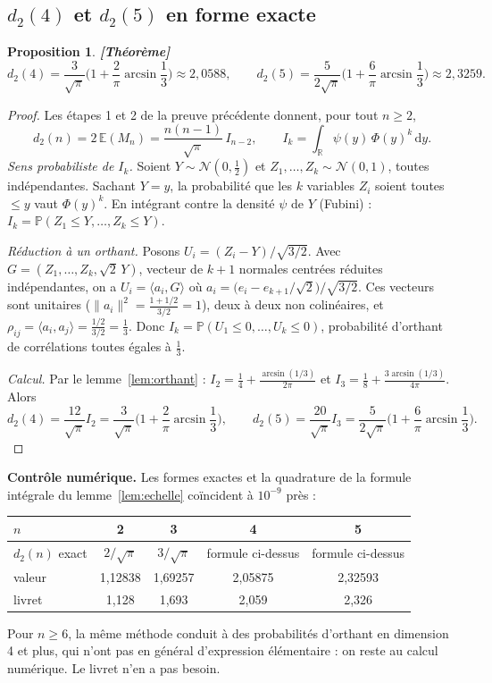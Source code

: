\documentclass[11pt,a4paper]{article}
\theoremstyle{tq}
\newtheorem{prop}{Proposition}
\theoremstyle{remark}
\newcommand{\thm}{\textcolor{vertTQ}{\textbf{[Théorème]}}}
\newcommand{\E}{\mathbb{E}}
\renewcommand{\P}{\mathbb{P}}
\newcommand{\R}{\mathbb{R}}
\newcommand{\N}{\mathcal{N}}
\newcommand{\dd}{\,\mathrm{d}}
\begin{document}
\subsection{$d_2(4)$ et $d_2(5)$ en forme exacte}
\begin{prop}\thm{}
\[
d_2(4)=\frac{3}{\sqrt\pi}\Big(1+\frac2\pi\arcsin\frac13\Big)\approx2{,}0588,\qquad
d_2(5)=\frac{5}{2\sqrt\pi}\Big(1+\frac6\pi\arcsin\frac13\Big)\approx2{,}3259 .
\]
\end{prop}
\begin{proof}
Les étapes 1 et 2 de la preuve précédente donnent, pour tout $n\ge2$,
\[
d_2(n)=2\,\E(M_n)=\frac{n(n-1)}{\sqrt\pi}\,I_{n-2},\qquad I_k=\int_{\R}\psi(y)\,\Phi(y)^k\dd y .
\]
\emph{Sens probabiliste de $I_k$.} Soient $Y\sim\N(0,\tfrac12)$ et $Z_1,\dots,Z_k\sim\N(0,1)$, toutes indépendantes. Sachant $Y=y$, la probabilité que les $k$ variables $Z_i$ soient toutes $\le y$ vaut $\Phi(y)^k$. En intégrant contre la densité $\psi$ de $Y$ (Fubini) : $I_k=\P(Z_1\le Y,\dots,Z_k\le Y)$.

\emph{Réduction à un orthant.} Posons $U_i=(Z_i-Y)/\sqrt{3/2}$. Avec $G=(Z_1,\dots,Z_k,\sqrt2\,Y)$, vecteur de $k+1$ normales centrées réduites indépendantes, on a $U_i=\langle a_i,G\rangle$ où $a_i=\big(e_i-e_{k+1}/\sqrt2\big)/\sqrt{3/2}$. Ces vecteurs sont unitaires ($\|a_i\|^2=\frac{1+1/2}{3/2}=1$), deux à deux non colinéaires, et $\rho_{ij}=\langle a_i,a_j\rangle=\frac{1/2}{3/2}=\frac13$. Donc $I_k=\P(U_1\le0,\dots,U_k\le0)$, probabilité d'orthant de corrélations toutes égales à $\frac13$.

\emph{Calcul.} Par le lemme~\ref{lem:orthant} :
$I_2=\frac14+\frac{\arcsin(1/3)}{2\pi}$ et $I_3=\frac18+\frac{3\arcsin(1/3)}{4\pi}$. Alors
\[
d_2(4)=\frac{12}{\sqrt\pi}I_2=\frac{3}{\sqrt\pi}\Big(1+\frac2\pi\arcsin\frac13\Big),\qquad
d_2(5)=\frac{20}{\sqrt\pi}I_3=\frac{5}{2\sqrt\pi}\Big(1+\frac6\pi\arcsin\frac13\Big).
\]
\end{proof}
\textbf{Contrôle numérique.} Les formes exactes et la quadrature de la formule intégrale du lemme~\ref{lem:echelle} coïncident à $10^{-9}$ près :
\begin{center}
\begin{tabular}{@{}lcccc@{}}
\toprule
$n$ & 2 & 3 & 4 & 5\\
\midrule
$d_2(n)$ exact & $2/\sqrt\pi$ & $3/\sqrt\pi$ & formule ci-dessus & formule ci-dessus\\
valeur & 1,12838 & 1,69257 & 2,05875 & 2,32593\\
livret & 1,128 & 1,693 & 2,059 & 2,326\\
\bottomrule
\end{tabular}
\end{center}
Pour $n\ge6$, la même méthode conduit à des probabilités d'orthant en dimension 4 et plus, qui n'ont pas en général d'expression élémentaire : on reste au calcul numérique. Le livret n'en a pas besoin.
\end{document}
